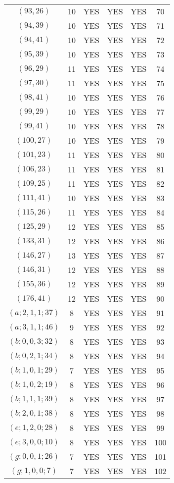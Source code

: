 \begin{longtable}{|c|c|c|c|c|c|}
$(93, 26)$ & 10 & YES & YES & YES & 70\\
$(94, 39)$ & 10 & YES & YES & YES & 71\\
$(94, 41)$ & 10 & YES & YES & YES & 72\\
$(95, 39)$ & 10 & YES & YES & YES & 73\\
$(96, 29)$ & 11 & YES & YES & YES & 74\\
$(97, 30)$ & 11 & YES & YES & YES & 75\\
$(98, 41)$ & 10 & YES & YES & YES & 76\\
$(99, 29)$ & 10 & YES & YES & YES & 77\\
$(99, 41)$ & 10 & YES & YES & YES & 78\\
$(100, 27)$ & 10 & YES & YES & YES & 79\\
$(101, 23)$ & 11 & YES & YES & YES & 80\\
$(106, 23)$ & 11 & YES & YES & YES & 81\\
$(109, 25)$ & 11 & YES & YES & YES & 82\\
$(111, 41)$ & 10 & YES & YES & YES & 83\\
$(115, 26)$ & 11 & YES & YES & YES & 84\\
$(125, 29)$ & 12 & YES & YES & YES & 85\\
$(133, 31)$ & 12 & YES & YES & YES & 86\\
$(146, 27)$ & 13 & YES & YES & YES & 87\\
$(146, 31)$ & 12 & YES & YES & YES & 88\\
$(155, 36)$ & 12 & YES & YES & YES & 89\\
$(176, 41)$ & 12 & YES & YES & YES & 90\\
$(a; 2, 1, 1; 37)$ & 8 & YES & YES & YES & 91\\
$(a; 3, 1, 1; 46)$ & 9 & YES & YES & YES & 92\\
$(b; 0, 0, 3; 32)$ & 8 & YES & YES & YES & 93\\
$(b; 0, 2, 1; 34)$ & 8 & YES & YES & YES & 94\\
$(b; 1, 0, 1; 29)$ & 7 & YES & YES & YES & 95\\
$(b; 1, 0, 2; 19)$ & 8 & YES & YES & YES & 96\\
$(b; 1, 1, 1; 39)$ & 8 & YES & YES & YES & 97\\
$(b; 2, 0, 1; 38)$ & 8 & YES & YES & YES & 98\\
$(e; 1, 2, 0; 28)$ & 8 & YES & YES & YES & 99\\
$(e; 3, 0, 0; 10)$ & 8 & YES & YES & YES & 100\\
$(g; 0, 0, 1; 26)$ & 7 & YES & YES & YES & 101\\
$(g; 1, 0, 0; 7)$ & 7 & YES & YES & YES & 102
\end{longtable}
